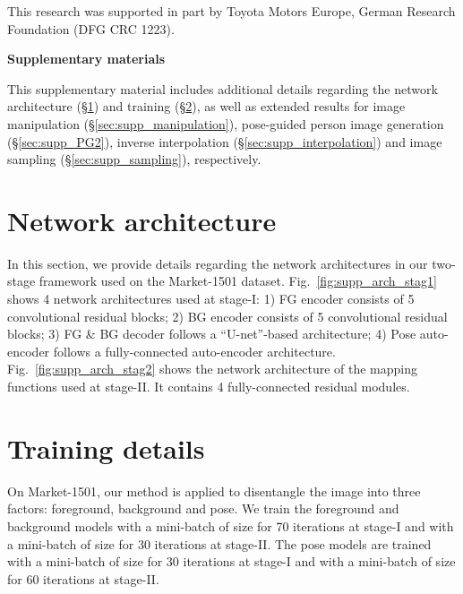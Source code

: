 \documentclass[10pt,twocolumn,letterpaper]{article}
\begin{document}
This research was supported in part by Toyota Motors Europe, German Research Foundation (DFG CRC 1223). {\small


}





\clearpage 
\noindent
{\Large {\textbf{Supplementary materials}}}
\\
\setcounter{section}{0}
\renewcommand\thesection{\Alph{section}}


This supplementary material includes additional details regarding the network architecture (\S\ref{sec:supp_arch}) and training (\S\ref{sec:supp_train}), as well as extended results for image manipulation (\S\ref{sec:supp_manipulation}), pose-guided person image generation (\S\ref{sec:supp_PG2}), inverse interpolation (\S\ref{sec:supp_interpolation}) and image sampling (\S\ref{sec:supp_sampling}), respectively.

\section{Network architecture}
\label{sec:supp_arch}

In this section, we provide details regarding the network architectures in our two-stage framework used on the Market-1501 dataset. Fig.~\ref{fig:supp_arch_stag1} shows 4 network architectures used at stage-\RN{1}: 1) FG encoder consists of 5 convolutional residual blocks; 2) BG encoder consists of 5 convolutional residual blocks; 3) FG \& BG decoder follows a ``U-net''-based architecture; 4) Pose auto-encoder follows a fully-connected auto-encoder architecture. 
Fig.~\ref{fig:supp_arch_stag2} shows the network architecture of the mapping functions  used at stage-\RN{2}. It contains 4 fully-connected residual modules.


\section{Training details}
\label{sec:supp_train}
On Market-1501, our method is applied to disentangle the image into three factors: foreground, background and pose.
We train the foreground and background models with a mini-batch of size  for 70 iterations at stage-\RN{1} and with a mini-batch of size  for 30 iterations at stage-\RN{2}. The pose models are trained with a mini-batch of size  for 30 iterations at stage-\RN{1} and with a mini-batch of size  for 60 iterations at stage-\RN{2}.
\end{document}
